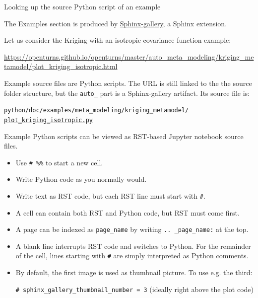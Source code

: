\documentclass[8pt, handout]{beamer}
\begin{document}
\begin{frame}{Looking up the source Python script of an example}

The Examples section is produced by \href{https://sphinx-gallery.github.io/stable/index.html}{\alert{Sphinx-gallery}}, a Sphinx extension.

Let us consider the \alert{Kriging with an isotropic covariance function} example:

\url{https://openturns.github.io/openturns/master/auto_meta_modeling/kriging_metamodel/plot_kriging_isotropic.html}

Example source files are \alert{Python scripts}.
The URL is still linked to the the source folder structure,
but the \texttt{auto\_} part is a Sphinx-gallery artifact. Its source file is:

\href{https://github.com/openturns/openturns/blob/master/python/doc/examples/meta_modeling/kriging_metamodel/plot_kriging_isotropic.py}{\texttt{python/doc/examples/meta\_modeling/kriging\_metamodel/\\plot\_kriging\_isotropic.py}}

Example Python scripts can be viewed as RST-based Jupyter notebook source files.

\begin{itemize}
    \item Use \alert{\texttt{\# \%\%}} to start a \alert{new cell}.
    \item Write \alert{Python code} as you \alert{normally} would.
    \item Write \alert{text as RST code}, but each RST line must start with \alert{\texttt{\#}}.
    \item A cell can contain both RST and Python code, but \alert{RST must come first}.  
    \item A page can be \alert{indexed} as \texttt{page\_name} by writing \texttt{.. \_page\_name:} at the top.
    \item A \alert{blank line} interrupts RST code and \alert{switches to Python}. For the remainder of the cell, lines starting with \alert{\texttt{\#}} are simply interpreted as Python comments.
    \item By default, the first image is used as \alert{thumbnail picture}. To use e.g. the third: %

    \texttt{\# sphinx\_gallery\_thumbnail\_number = 3} (ideally right above the plot code)
\end{itemize}

\end{frame}
\end{document}

